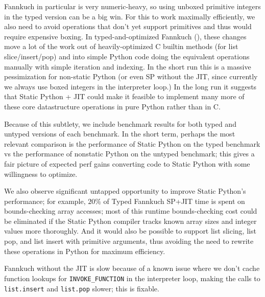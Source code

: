 \documentclass[english,cleveref,crc]{programming}
\newcommand{\code}[1]{\texttt{#1}}
\begin{document}
Fannkuch in particular is very numeric-heavy, so using unboxed primitive
integers in the typed version can be a big win. For this to work maximally
efficiently, we also need to avoid operations that don't yet support primitives
and thus would require expensive boxing. In typed-and-optimized Fannkuch (), these changes move
a lot of the work out of heavily-optimized C builtin methods (for list
slice/insert/pop) and into simple Python code doing the equivalent operations
manually with simple iteration and indexing. In the short run this is a massive
pessimization for non-static Python (or even SP without the JIT, since
currently we always use boxed integers in the interpreter loop.) In the long
run it suggests that Static Python + JIT could make it feasible to implement
many more of these core datastructure operations in pure Python rather than in
C.

Because of this subtlety, we include benchmark results for both typed and
untyped versions of each benchmark. In the short term, perhaps the most
relevant comparison is the performance of Static Python on the typed benchmark
vs the performance of nonstatic Python on the untyped benchmark; this gives a
fair picture of expected perf gains converting code to Static Python with some
willingness to optimize.

We also observe significant untapped opportunity to improve Static Python's
performance; for example, $20\%$ of Typed Fannkuch SP+JIT time is spent on
bounds-checking array accesses; most of this runtime bounds-checking cost could
be eliminated if the Static Python compiler tracks known array sizes and
integer values more thoroughly. And it would also be possible to support list
slicing, list pop, and list insert with primitive arguments, thus avoiding the
need to rewrite these operations in Python for maximum efficiency.

 Fannkuch without the JIT is slow because of a known issue where we
don't cache function lookups for \code{INVOKE\_FUNCTION} in the interpreter loop,
making the calls to \code{list.insert} and \code{list.pop} slower; this is fixable.
\end{document}
